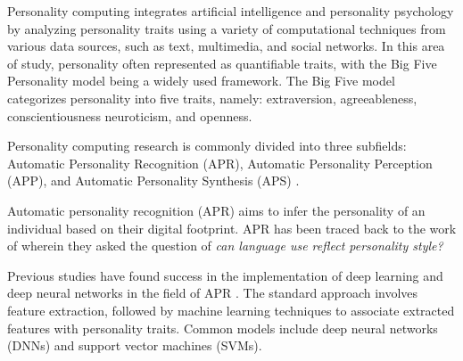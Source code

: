 Personality computing integrates artificial intelligence and personality psychology by analyzing personality traits using a variety of computational techniques from various data sources, such as text, multimedia, and social networks. In this area of study, personality often represented as quantifiable traits, with the Big Five Personality model being a widely used framework. The Big Five model categorizes personality into five traits, namely: extraversion, agreeableness, conscientiousness neuroticism, and openness. 

Personality computing research is commonly divided into three subfields: Automatic Personality Recognition (APR), Automatic Personality Perception (APP), and Automatic Personality Synthesis (APS) \citep{Vinciarelli2014}.

Automatic personality recognition (APR) aims to infer the personality of an individual based on their digital footprint. APR has been traced back to the work of \citet{Pennebaker1999} wherein they asked the question of \textit{can language use reflect personality style?}


Previous studies have found success in the implementation of deep learning and deep neural networks in the field of APR \citep{Zhao2022}. The standard approach involves feature extraction, followed by machine learning techniques to associate extracted features with personality traits. Common models include deep neural networks (DNNs) and support vector machines (SVMs). 

